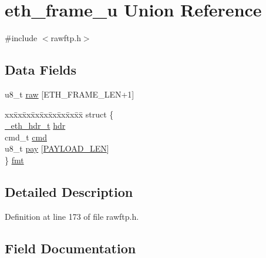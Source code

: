 \hypertarget{unioneth__frame__u}{}\section{eth\+\_\+frame\+\_\+u Union Reference}
\label{unioneth__frame__u}


{\ttfamily \#include $<$rawftp.\+h$>$}

\subsection*{Data Fields}
\begin{DoxyCompactItemize}
\item 
u8\+\_\+t \hyperlink{unioneth__frame__u_a1bdd89949a8259c99b4e5a7f332290f7}{raw} \mbox{[}E\+T\+H\+\_\+\+F\+R\+A\+M\+E\+\_\+\+L\+EN+1\mbox{]}
\item 
\begin{tabbing}
xx\=xx\=xx\=xx\=xx\=xx\=xx\=xx\=xx\=\kill
struct \{\\
\>\hyperlink{eth_8c_a602f0f5470a6e6fb2fa3a0e84b1cb58e}{\_eth\_hdr\_t} \hyperlink{unioneth__frame__u_a836db811e18860e8adf76cf147200ff5}{hdr}\\
\>cmd\_t \hyperlink{unioneth__frame__u_a632b86f554c9e62ec235f94f195a75e8}{cmd}\\
\>u8\_t \hyperlink{unioneth__frame__u_a41cea27b705531eda8d10d63e814e474}{pay} \mbox{[}\hyperlink{rawftp_8h_a212a14606599edd2c69298c5cffa64a0}{PAYLOAD\_LEN}\mbox{]}\\
\} \hyperlink{unioneth__frame__u_aa60fa70581c95caf169086f9aa7025af}{fmt}\\

\end{tabbing}\end{DoxyCompactItemize}


\subsection{Detailed Description}


Definition at line 173 of file rawftp.\+h.



\subsection{Field Documentation}
\hypertarget{unioneth__frame__u_a632b86f554c9e62ec235f94f195a75e8}{}\label{unioneth__frame__u_a632b86f554c9e62ec235f94f195a75e8} 
